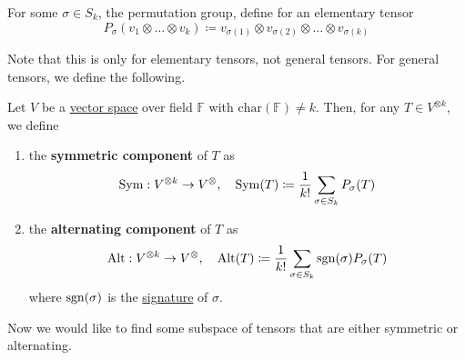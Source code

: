 	\begin{definition}
	  \label{def:permutation-of-tensor-factors}
	  For some $\sigma \in S_k$, the permutation group, define for an elementary tensor 
		\begin{equation}
			P_\sigma(v_1 \otimes \ldots \otimes v_k) \coloneqq v_{\sigma(1)} \otimes v_{\sigma(2)} \otimes \ldots \otimes v_{\sigma(k)}
		\end{equation}
	\end{definition}

	Note that this is only for elementary tensors, not general tensors. For general tensors, we define the following. 

	\begin{definition}
	  \label{def:symmetric-alternating-tensors}
		Let $V$ be a \hyperref[def:vector-space]{vector space} over field $\mathbb{F}$ with $\mathrm{char}(\mathbb{F}) \neq k$. Then, for any $T \in V^{\otimes k}$, we define 
		\begin{enumerate}
			\item the \textbf{symmetric component} of $T$ as 
				\begin{equation}
					\operatorname{Sym}: V^{\otimes k} \to V^{\otimes }, \quad \operatorname{Sym}(T) \coloneqq \frac{1}{k!} \sum_{\sigma \in S_k} P_\sigma (T)
				\end{equation}

			\item the \textbf{alternating component} of $T$ as 
				\begin{equation}
					\operatorname{Alt}: V^{\otimes k} \to V^{\otimes }, \quad \operatorname{Alt}(T) \coloneqq \frac{1}{k!} \sum_{\sigma \in S_k} \operatorname{sgn}(\sigma) P_\sigma (T)
				\end{equation}
				where $\operatorname{sgn}(\sigma)$ is the \hyperref[alg-def:signature]{signature} of $\sigma$. 
		\end{enumerate}
	\end{definition}

	Now we would like to find some subspace of tensors that are either symmetric or alternating. 

